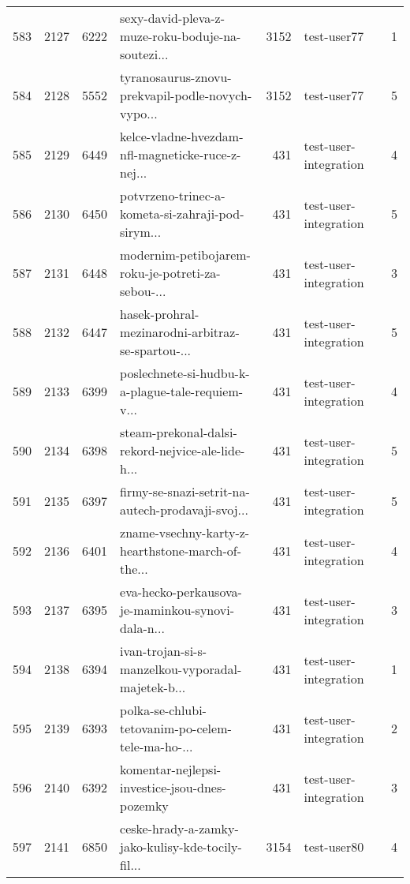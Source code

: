 \begin{tabular}{lrrlrlr}
583  &       2127 &     6222 &  sexy-david-pleva-z-muze-roku-boduje-na-soutezi... &     3152 &                  test-user77 &               1 \\
584  &       2128 &     5552 &  tyranosaurus-znovu-prekvapil-podle-novych-vypo... &     3152 &                  test-user77 &               5 \\
585  &       2129 &     6449 &  kelce-vladne-hvezdam-nfl-magneticke-ruce-z-nej... &      431 &        test-user-integration &               4 \\
586  &       2130 &     6450 &  potvrzeno-trinec-a-kometa-si-zahraji-pod-sirym... &      431 &        test-user-integration &               5 \\
587  &       2131 &     6448 &  modernim-petibojarem-roku-je-potreti-za-sebou-... &      431 &        test-user-integration &               3 \\
588  &       2132 &     6447 &  hasek-prohral-mezinarodni-arbitraz-se-spartou-... &      431 &        test-user-integration &               5 \\
589  &       2133 &     6399 &  poslechnete-si-hudbu-k-a-plague-tale-requiem-v... &      431 &        test-user-integration &               4 \\
590  &       2134 &     6398 &  steam-prekonal-dalsi-rekord-nejvice-ale-lide-h... &      431 &        test-user-integration &               5 \\
591  &       2135 &     6397 &  firmy-se-snazi-setrit-na-autech-prodavaji-svoj... &      431 &        test-user-integration &               5 \\
592  &       2136 &     6401 &  zname-vsechny-karty-z-hearthstone-march-of-the... &      431 &        test-user-integration &               4 \\
593  &       2137 &     6395 &  eva-hecko-perkausova-je-maminkou-synovi-dala-n... &      431 &        test-user-integration &               3 \\
594  &       2138 &     6394 &  ivan-trojan-si-s-manzelkou-vyporadal-majetek-b... &      431 &        test-user-integration &               1 \\
595  &       2139 &     6393 &  polka-se-chlubi-tetovanim-po-celem-tele-ma-ho-... &      431 &        test-user-integration &               2 \\
596  &       2140 &     6392 &      komentar-nejlepsi-investice-jsou-dnes-pozemky &      431 &        test-user-integration &               3 \\
597  &       2141 &     6850 &  ceske-hrady-a-zamky-jako-kulisy-kde-tocily-fil... &     3154 &                  test-user80 &               4 \\

\end{tabular}
